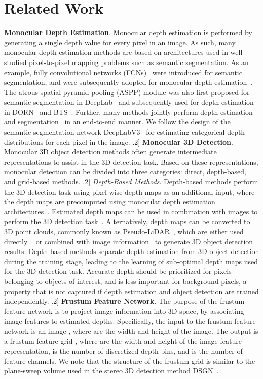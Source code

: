 \documentclass[final]{cvpr}
\begin{document}
\section{Related Work} \label{sec:RelatedWork}
\noindent\textbf{Monocular Depth Estimation}.
Monocular depth estimation is performed by generating a single depth value for every pixel in an image. As such, many monocular depth estimation methods are based on architectures used in well-studied pixel-to-pixel mapping problems such as semantic segmentation. As an example, fully convolutional networks (FCNs)~\cite{FCN} were introduced for semantic segmentation, and were subsequently adopted for monocular depth estimation~\cite{Laina}. The atrous spatial pyramid pooling (ASPP) module was also first proposed for semantic segmentation in DeepLab~\cite{DeepLab, DeepLabAlt, DeepLabV3} and subsequently used for depth estimation in DORN~\cite{DORN} and BTS~\cite{BTS}. Further, many methods jointly perform depth estimation and segmentation~\cite{PAD-Net, JointSeg, SDC-Depth, Eigen2} in an end-to-end manner. We follow the design of the semantic segmentation network DeepLabV3~\cite{DeepLabV3} for estimating categorical depth distributions for each pixel in the image.
\0.2\baselineskip]
\noindent\textbf{Monocular 3D Detection}.
Monocular 3D object detection methods often generate intermediate representations to assist in the 3D detection task. Based on these representations, monocular detection can be divided into three categories: direct, depth-based, and grid-based methods.
\0.2\baselineskip]
\noindent\textit{Depth-Based Methods}.
Depth-based methods perform the 3D detection task using pixel-wise depth maps as an additional input, where the depth maps are precomputed using monocular depth estimation architectures~\cite{DORN}. Estimated depth maps can be used in combination with images to perform the 3D detection task~\cite{ROI-10D,UR3D,PatchNet,D4LCN}. Alternatively, depth maps can be converted to 3D point clouds, commonly known as Pseudo-LiDAR~\cite{Psuedo-LIDAR}, which are either used directly ~\cite{Mono3D_Plidar, DA-3Ddet} or combined with image information~\cite{MultiFusion,AM3D} to generate 3D object detection results. Depth-based methods separate depth estimation from 3D object detection during the training stage, leading to the learning of sub-optimal depth maps used for the 3D detection task. Accurate depth should be prioritized for pixels belonging to objects of interest, and is less important for background pixels, a property that is not captured if depth estimation and object detection are trained independently.
\0.2\baselineskip]
\noindent\textbf{Frustum Feature Network}.
The purpose of the frustum feature network is to project image information into 3D space, by associating image features to estimated depths. Specifically, the input to the frustum feature network is an image , where  are the width and height of the image. The output is a frustum feature grid , where  are the width and height of the image feature representation,  is the number of discretized depth bins, and  is the number of feature channels. We note that the structure of the frustum grid is similar to the plane-sweep volume used in the stereo 3D detection method DSGN~\cite{DSGN}.
\end{document}

